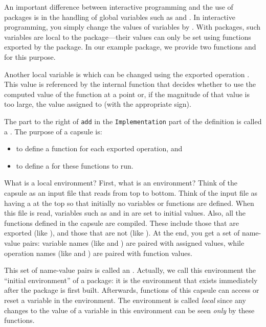 An important difference between interactive programming and the
use of packages is in the handling of global variables such as
 and .
In interactive programming, you simply change the values of
variables by .
With packages, such variables are local to the package---their
values can only be set using functions exported by the package.
In our example package, we provide two functions
 and  for
this purpose.

Another local variable is  which can be changed using
the exported operation .
This value is referenced by the internal function  that
decides whether to use the computed value of the function at a point or,
if the magnitude of that value is too large, the
value assigned to  (with the
appropriate sign).

%
The part to the right of {\tt add} in the {\tt Implementation}
part of the definition is called a .
The purpose of a capsule is:
\begin{itemize}
\item to define a function for each exported operation, and
\item to define a  for these functions to run.
\end{itemize}

What is a local environment?
First, what is an environment?
Think of the capsule as an input file that \Language{} reads from top to
bottom.
Think of the input file as having a  at the top
so that initially no variables or functions are defined.
When this file is read, variables such as  and
 in  are set to initial values.
Also, all the functions defined in the capsule are compiled.
These include those that are exported (like ), and
those that are not (like ).
At the end, you get a set of name-value pairs:
variable names (like  and )
are paired with assigned values, while
operation names (like  and )
are paired with function values.

This set of name-value pairs is called an .
Actually, we call this environment the ``initial environment'' of a package:
it is the environment that exists immediately after the package is
first built.
Afterwards, functions of this capsule can
access or reset a variable in the environment.
The environment is called {\it local} since any changes to the value of a
variable in this environment can be seen {\it only} by these functions.

